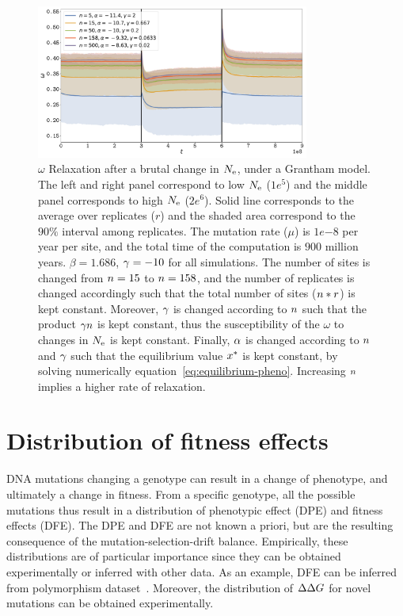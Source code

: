 \documentclass{article}
\begin{document}
\begin{figure}[H]
    \centering
    \includegraphics[width=0.8\textwidth] {Relaxation-Stability-Grantham-Alpha-Gamma.pdf}
    \caption[Relaxation time of $\omega$ for the Grantham model]{
    $\omega$ Relaxation after a brutal change in $N_{\text{e}}$, under a Grantham model.
    The left and right panel correspond to low $N_{\text{e}}$ ($1e^{5}$) and the middle panel corresponds to high $N_{\text{e}}$ ($2e^{6}$).
    Solid line corresponds to the average over replicates ($r$) and the shaded area correspond to the $90\%$ interval among replicates.
    The mutation rate ($\mu$) is $1e{-8}$ per year per site, and the total time of the computation is $900$ million years.
    $\beta=1.686$, $\gamma=-10$ for all simulations. The number of sites is changed from $n=15$ to $n=158$, and the number of replicates is changed accordingly such that the total number of sites ($n*r$) is kept constant.
    Moreover, $\gamma$ is changed according to $n$ such that the product $\gamma n$ is kept constant, thus the susceptibility of the $\omega$ to changes in $N_{\text{e}}$ is kept constant.
    Finally, $\alpha$ is changed according to $n$ and $\gamma$ such that the equilibrium value $x^{*}$ is kept constant, by solving numerically equation~\ref{eq:equilibrium-pheno}.
    Increasing $n$ implies a higher rate of relaxation.}
\end{figure}


\section{Distribution of fitness effects}
\label{sec:distribution-of-fitness-effects}

DNA mutations changing a genotype can result in a change of {phenotype}, and ultimately a change in fitness.
From a specific genotype, all the possible mutations thus result in a distribution of phenotypic effect (DPE) and fitness effects ({DFE}).
The DPE and {DFE} are not known a priori, but are the resulting consequence of the mutation-selection-drift balance.
Empirically, these distributions are of particular importance since they can be obtained experimentally or inferred with other data.
As an example, {DFE} can be inferred from polymorphism dataset~\citep{Eyre-walker2007, Galtier2016}.
Moreover, the distribution of $\Delta \Delta G$ for novel mutations can be obtained experimentally.
\end{document}
